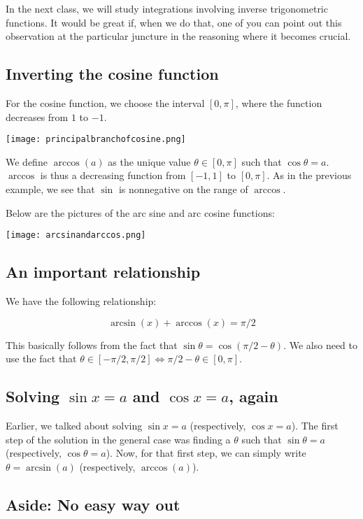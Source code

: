 \documentclass{amsart}
\begin{document}
In the next class, we will study integrations involving inverse
trigonometric functions. It would be great if, when we do that, one of
you can point out this observation at the particular juncture in the
reasoning where it becomes crucial.

\subsection{Inverting the cosine function}

For the cosine function, we choose the interval $[0,\pi]$, where the
function decreases from $1$ to $-1$. 

\texttt{[image: principalbranchofcosine.png]}

We define $\arccos(a)$ as the unique value $\theta \in [0,\pi]$ such
that $\cos \theta = a$. $\arccos$ is thus a decreasing function from
$[-1,1]$ to $[0,\pi]$. As in the previous example, we see that $\sin$
is nonnegative on the range of $\arccos$.

Below are the pictures of the arc sine and arc cosine functions:

\texttt{[image: arcsinandarccos.png]}

\subsection{An important relationship}

We have the following relationship:

$$\arcsin(x) + \arccos(x) = \pi/2$$

This basically follows from the fact that $\sin \theta = \cos(\pi/2 -
\theta)$. We also need to use the fact that $\theta \in [-\pi/2,\pi/2]
\iff \pi/2 - \theta \in [0,\pi]$.

\subsection{Solving $\sin x = a$ and $\cos x = a$, again}

Earlier, we talked about solving $\sin x = a$ (respectively, $\cos x =
a$). The first step of the solution in the general case was finding a
$\theta$ such that $\sin \theta = a$ (respectively, $\cos \theta =
a$). Now, for that first step, we can simply write $\theta =
\arcsin(a)$ (respectively, $\arccos(a)$).

\subsection*{Aside: No easy way out}
\end{document}
